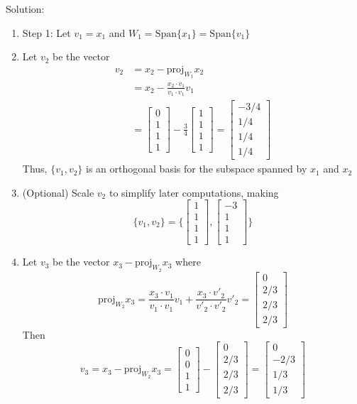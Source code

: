\documentclass[12pt]{article} %
\begin{document}
Solution:
\begin{enumerate}
	\item Step 1: Let $v_1 = x_1$ and $W_1 = \text{Span}\{x_1\} = \text{Span}\{v_1\}$
	\item Let $v_2$ be the vector
	\begin{align*}
		v_2 &= x_2 - \text{proj}_{W_1} x_2\\
		&= x_2 - \frac{x_2 \cdot v_1}{v_1 \cdot v_1} v_1\\
		&= \begin{bmatrix}
			0\\1\\1\\1
		\end{bmatrix} - \frac{3}{4} \begin{bmatrix}
			1\\1\\1\\1
		\end{bmatrix} = \begin{bmatrix}
			-3/4\\1/4\\1/4\\1/4
		\end{bmatrix}
	\end{align*}
	Thus, $\{v_1, v_2\}$ is an orthogonal basis for the subspace spanned by $x_1$ and $x_2$
	\item (Optional) Scale $v_2$ to simplify later computations, making
	$$\{v_1, v_2\} = \{\begin{bmatrix}
		1\\1\\1\\1
	\end{bmatrix}, \begin{bmatrix}
		-3\\1\\1\\1
	\end{bmatrix}\}$$
	\item Let $v_3$ be the vector $x_3 - \text{proj}_{W_2} x_3$ where 
	$$\text{proj}_{W_2} x_3 = \frac{x_3 \cdot v_1}{v_1 \cdot v_1} v_1 + \frac{x_3 \cdot v'_2}{v'_2 \cdot v'_2} v'_2 = \begin{bmatrix}
		0 \\2/3\\2/3\\2/3
	\end{bmatrix}$$
	Then 
	$$v_3 = x_3 - \text{proj}_{W_2} x_3 = \begin{bmatrix}
		0\\0\\1\\1
	\end{bmatrix} - \begin{bmatrix}
		0 \\2/3\\2/3\\2/3
	\end{bmatrix} = \begin{bmatrix}
		0 \\ -2/3\\1/3\\1/3
	\end{bmatrix}$$	
\end{enumerate}
\end{document}
